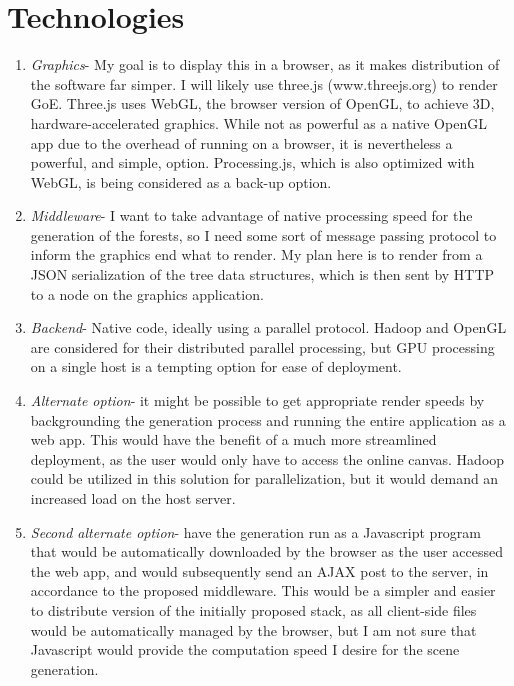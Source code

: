 \documentclass{article}
\begin{document}
    \section{Technologies}
\begin{enumerate}
    \item \emph{Graphics}- My goal is to display this in a browser, as it makes
distribution of the software far simper. I will likely use three.js
(www.threejs.org) to render GoE. Three.js uses WebGL, the browser version of
OpenGL, to achieve 3D, hardware-accelerated graphics. While not as powerful as a
native OpenGL app due to the overhead of running on a browser, it is
nevertheless a powerful, and simple, option. Processing.js, which is also
optimized with WebGL, is being considered as a back-up option.

    \item \emph{Middleware}- I want to take advantage of native processing speed
for the generation of the forests, so I need some sort of message passing
protocol to inform the graphics end what to render. My plan here is to render
from a JSON serialization of the tree data structures, which is then sent by
HTTP to a node on the graphics application.

    \item \emph{Backend}- Native code, ideally using a parallel protocol. Hadoop
and OpenGL are considered for their distributed parallel processing, but GPU
processing on a single host is a tempting option for ease of deployment.

    \item \emph{Alternate option}- it might be possible to get appropriate
render speeds by backgrounding the generation process and running the entire
application as a web app. This would have the benefit of a much more streamlined
deployment, as the user would only have to access the online canvas. Hadoop
could be utilized in this solution for parallelization, but it would demand an
increased load on the host server.

    \item \emph{Second alternate option}- have the generation run as a
Javascript program that would be automatically downloaded by the browser as the
user accessed the web app, and would subsequently send an AJAX post to the
server, in accordance to the proposed middleware. This would be a simpler and
easier to distribute version of the initially proposed stack, as all client-side
files would be automatically managed by the browser, but I am not sure that
Javascript would provide the computation speed I desire for the scene
generation.

\end{enumerate}
\end{document}
